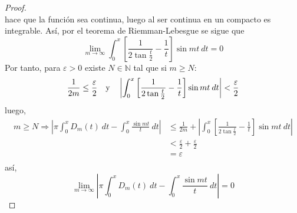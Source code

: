 \documentclass[12pt]{report}
\theoremstyle{largebreak}
\newcommand\abs[1]{\ensuremath{\left|#1\right|}}
\begin{document}
\begin{proof}
\begin{equation*}
        \end{equation*}
        hace que la función sea continua, luego al ser continua en un compacto es integrable. Así, por el teorema de Riemman-Lebesgue se sigue que
        \begin{equation*}
            \lim_{ m\rightarrow\infty}\int_{0}^{x}\left[\frac{1}{2\tan\frac{t}{2}}-\frac{1}{t}\right]\sin mt\:dt=0
        \end{equation*}
        Por tanto, para $\varepsilon>0$ existe $N\in\mathbb{N}$ tal que si $m\geq N$:
        \begin{equation*}
            \frac{1}{2m}\leq\frac{\varepsilon}{2}\quad\textup{y}\quad\abs{\int_{0}^{x}\left[\frac{1}{2\tan\frac{t}{2}}-\frac{1}{t}\right]\sin mt\:dt}<\frac{\varepsilon}{2}
        \end{equation*}
        luego,
        \begin{equation*}
            \begin{split}
                m\geq N\Rightarrow\abs{\pi\int_0^x D_m(t)\:dt-\int_{0}^{x}\frac{\sin mt}{t}\:dt}&\leq\frac{1}{2m}+\abs{\int_{0}^{x}\left[\frac{1}{2\tan\frac{t}{2}}-\frac{1}{t}\right]\sin mt\:dt}\\
                &<\frac{\varepsilon}{2}+\frac{\varepsilon}{2}\\
                &=\varepsilon\\
            \end{split}
        \end{equation*}
        así,
        \begin{equation*}
            \lim_{ m\rightarrow\infty}\abs{\pi\int_0^x D_m(t)\:dt-\int_{0}^{x}\frac{\sin mt}{t}\:dt}=0
        \end{equation*}


\end{proof}
\end{document}
